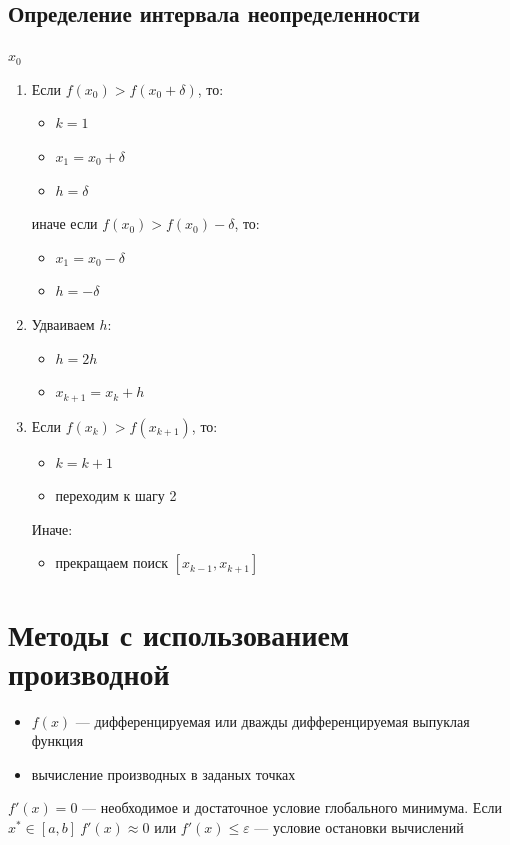\documentclass[oneside]{book}
\theoremstyle{plain}
\theoremstyle{remark}
\theoremstyle{definition}
\begin{document}
\subsection{Определение интервала неопределенности}
\label{sec:org6b2618e}
\(x_0\)
\begin{enumerate}
\item Если \(f(x_0) > f(x_0 + \delta)\), то:
\begin{itemize}
\item \(k = 1\)
\item \(x_1 = x_0 + \delta\)
\item \(h = \delta\)
\end{itemize}
иначе если \(f(x_0) > f(x_0) - \delta\), то:
\begin{itemize}
\item \(x_1 = x_0 - \delta\)
\item \(h = -\delta\)
\end{itemize}
\item Удваиваем \(h\):
\begin{itemize}
\item \(h = 2h\)
\item \(x_{k + 1} = x_k + h\)
\end{itemize}
\item Если \(f(x_k) > f(x_{k + 1})\), то:
\begin{itemize}
\item \(k = k + 1\)
\item переходим к шагу 2
\end{itemize}
Иначе:
\begin{itemize}
\item прекращаем поиск \([x_{k - 1}, x_{k + 1}]\)
\end{itemize}
\end{enumerate}
\section{Методы с использованием производной}
\label{sec:orgda9e49c}

\begin{itemize}
\item \(f(x)\) --- дифференцируемая или дважды дифференцируемая выпуклая функция
\item вычисление производных в заданых точках
\end{itemize}

\(f'(x) = 0\) --- необходимое и достаточное условие глобального
минимума.  Если \(x^* \in [a, b]\ f'(x) \approx 0\) или \(f'(x) \le
\varepsilon\) --- условие остановки вычислений
\end{document}
